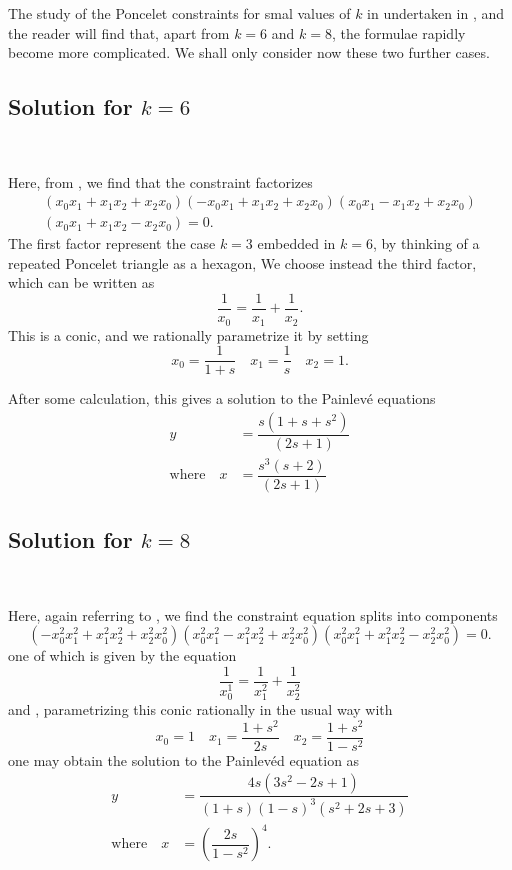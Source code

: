 The study of the Poncelet constraints for smal values of $k$ in undertaken in \cite{chap7-key1}, and the reader will find that, apart from $k=6$ and $k=8$, the formulae
rapidly become more complicated. We shall only consider now these two further cases.

\subsection{Solution for \boldmath$k=6$}\label{chap7-subsec-6.4}
\pageoriginale
~

\smallskip
\noindent
Here, from \cite{chap7-key1}, we find that the constraint factorizes
\begin{equation*}
\begin{split}
(x_{0}x_{1} + x_{1}x_{2} +x_{2}x_{0})(-x_{0}x_{1}+x_{1}x_{2}+x_{2}x_{0})(x_{0}x_{1}-x_{1}x_{2}+x_{2}x_{0})\\
(x_{0}x_{1}+x_{1}x_{2}-x_{2}x_{0})=0.
\end{split}
\end{equation*}
The first factor represent the case $k=3$ embedded in $k=6$, by thinking of a repeated Poncelet triangle as a hexagon, We choose instead the third factor, which can be written as
$$
\dfrac{1}{x_{0}} = \dfrac{1}{x_{1}}+\dfrac{1}{x_{2}}.
$$
This is a conic, and we rationally parametrize it by setting
$$
x_{0}=\dfrac{1}{1+s} \quad x_{1}=\dfrac{1}{s}\quad x_{2}=1.
$$ 

After some calculation, this gives a solution to the Painlev\'e equations
\begin{align*}
y&=\dfrac{s(1+s+s^{2})}{(2s+1)}\\
\text{where} \quad x &= \dfrac{s^{3}(s+2)}{(2s+1)}
\end{align*}

\subsection{Solution for \boldmath$k=8$}\label{chap7-subsec-6.5}
~

\smallskip
\noindent
Here, again referring to \cite{chap7-key1}, we find the constraint equation splits into components
$$
(-x_{0}^{2}x_{1}^{2} + x_{1}^{2}x_{2}^{2} + x_{2}^{2}x_{0}^{2})(x_{0}^{2}x_{1}^{2} - x_{1}^{2}x_{2}^{2}+x_{2}^{2}x_{0}^{2})
(x_{0}^{2}x_{1}^{2} + x_{1}^{2}x_{2}^{2} - x_{2}^{2}x_{0}^{2}) =0.
$$
one of which is given by the equation
$$
\dfrac{1}{x_{0}^{1}}= \dfrac{1}{x_{1}^{2}}+\dfrac{1}{x_{2}^{2}}
$$
and , parametrizing this conic rationally in the usual way with
$$
x_{0}=1 \quad x_{1}=\dfrac{1+s^{2}}{2s} \quad x_{2}= \dfrac{1+s^{2}}{1-s^{2}}
$$
one may obtain the solution to the Painlev\'ed equation as
\begin{align*}
y&= \dfrac{4s(3s^{2}-2s+1)}{(1+s)(1-s)^{3}(s^{2}+2s+3)}\\
\text{where} \quad x &= \left(\dfrac{2s}{1-s^{2}}\right)^{4}.
\end{align*}

